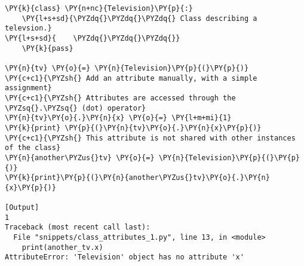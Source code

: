 \begin{Verbatim}[label=\makebox{\url{https://github.com/lucabaldini/cmepda/tree/master/slides/latex/snippets/class\_attributes\_1.py}},commandchars=\\\{\}]
\PY{k}{class} \PY{n+nc}{Television}\PY{p}{:}
    \PY{l+s+sd}{\PYZdq{}\PYZdq{}\PYZdq{} Class describing a televsion.}
\PY{l+s+sd}{    \PYZdq{}\PYZdq{}\PYZdq{}}
    \PY{k}{pass}

\PY{n}{tv} \PY{o}{=} \PY{n}{Television}\PY{p}{(}\PY{p}{)}
\PY{c+c1}{\PYZsh{} Add an attribute manually, with a simple assignment}
\PY{c+c1}{\PYZsh{} Attributes are accessed through the \PYZsq{}.\PYZsq{} (dot) operator}
\PY{n}{tv}\PY{o}{.}\PY{n}{x} \PY{o}{=} \PY{l+m+mi}{1}
\PY{k}{print} \PY{p}{(}\PY{n}{tv}\PY{o}{.}\PY{n}{x}\PY{p}{)}
\PY{c+c1}{\PYZsh{} This attribute is not shared with other instances of the class}
\PY{n}{another\PYZus{}tv} \PY{o}{=} \PY{n}{Television}\PY{p}{(}\PY{p}{)}
\PY{k}{print}\PY{p}{(}\PY{n}{another\PYZus{}tv}\PY{o}{.}\PY{n}{x}\PY{p}{)}

[Output]
1
Traceback (most recent call last):
  File "snippets/class_attributes_1.py", line 13, in <module>
    print(another_tv.x)
AttributeError: 'Television' object has no attribute 'x'
\end{Verbatim}